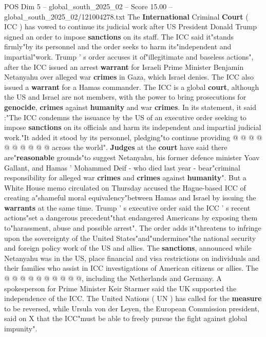 \begin{textsample}{POS Dim 5 – global\_south\_2025\_02 – Score 15.00 – global\_south\_2025\_02/121004278.txt}  \label{ex:f5_pos_217}
The \textbf{International} Criminal \textbf{Court} ( ICC ) has vowed to continue its judicial work after US President Donald Trump signed an order to impose \textbf{sanctions} on its staff.
The ICC said it"stands firmly"by its personnel and the order seeks to harm its"independent and impartial"work.
Trump ' s order accuses it of"illegitimate and baseless actions", after the ICC issued an arrest \textbf{warrant} for Israeli Prime Minister Benjamin Netanyahu over alleged war \textbf{crimes} in Gaza, which Israel denies.
The ICC also issued a \textbf{warrant} for a Hamas commander.
The ICC is a global \textbf{court}, although the US and Israel are not members, with the power to bring prosecutions for \textbf{genocide}, \textbf{crimes} against \textbf{humanity} and war \textbf{crimes}.
In its statement, it said :"The ICC condemns the issuance by the US of an executive order seeking to impose \textbf{sanctions} on its officials and harm its independent and impartial judicial work."It added it stood by its personnel, pledging"to continue providing @ @ @ @ @ @ @ @ @ @ across the world". \textbf{Judges} at the \textbf{court} have said there are"\textbf{reasonable} grounds"to suggest Netanyahu, his former defence minister Yoav Gallant, and Hamas ' Mohammed Deif - who died last year - bear"criminal responsibility for alleged war \textbf{crimes} and \textbf{crimes} against \textbf{humanity}".
But a White House memo circulated on Thursday accused the Hague-based ICC of creating a"shameful moral equivalency"between Hamas and Israel by issuing the \textbf{warrants} at the same time.
Trump ' s executive order said the ICC ' s recent actions"set a dangerous precedent"that endangered Americans by exposing them to"harassment, abuse and possible arrest".
The order adds it"threatens to infringe upon the sovereignty of the United States"and"undermines"the national security and foreign policy work of the US and allies.
The \textbf{sanctions}, announced while Netanyahu was in the US, place financial and visa restrictions on individuals and their families who assist in ICC investigations of American citizens or allies.
The @ @ @ @ @ @ @ @ @ @, including the Netherlands and Germany.
A spokesperson for Prime Minister Keir Starmer said the UK supported the independence of the ICC.
The United Nations ( UN ) has called for the \textbf{measure} to be reversed, while Ursula von der Leyen, the European Commission president, said on X that the ICC"must be able to freely pursue the fight against global impunity".

\end{textsample}
